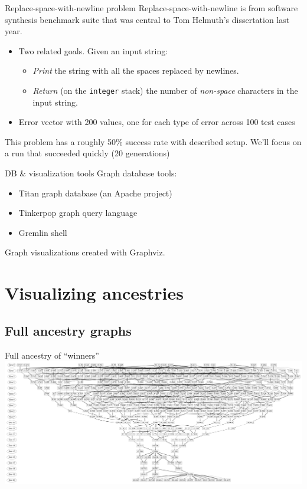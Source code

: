 \documentclass{beamer}
\newcommand{\linespace}{\vskip 0.25cm}
\begin{document}
\begin{frame}{Replace-space-with-newline problem}
	Replace-space-with-newline is from software synthesis benchmark suite that was central to Tom Helmuth's dissertation last year.
	\begin{itemize}
		\item Two related goals. Given an input string:
		\begin{itemize}
			\item \emph{Print} the string with all the spaces replaced by newlines.
			\item \emph{Return} (on the \texttt{integer} stack) the number of \emph{non-space} characters in the input string.
		\end{itemize}
		\item Error vector with 200 values, one for each type of error across 100 test cases
	\end{itemize}
	
	This problem has a roughly 50\% success rate with described setup.
	\linespace
	We'll focus on a run that succeeded quickly (20 generations)
\end{frame}

\begin{frame}{DB \& visualization tools}
	Graph database tools:
	\begin{itemize}
		\item Titan graph database (an Apache project)
		\item Tinkerpop graph query language
		\item Gremlin shell
	\end{itemize}
	\linespace
	Graph visualizations created with Graphviz.
\end{frame}

\section{Visualizing ancestries}

\subsection{Full ancestry graphs}

\begin{frame}{Full ancestry of ``winners''}
	\centering
	\includegraphics[width=\linewidth]{../../figures/run0_GPTP_2_font_40}
\end{frame}
\end{document}
